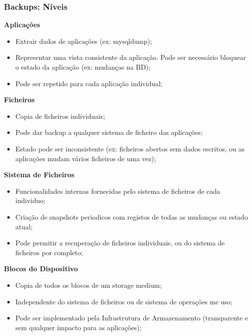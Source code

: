 \documentclass{article}
\begin{document}
\subsubsection{Backups: Níveis}

\begin{flushleft}
  \textbf{Aplicações}
  \begin{itemize}
    \item Extrair dados de aplicações (ex: mysqldump);
    \item Representar uma vista consistente da aplicação.
    Pode ser necessário bloquear o estado da aplicação (ex: mudanças na BD);
    \item Pode ser repetido para cada aplicação individual;
  \end{itemize}

  \textbf{Ficheiros}
  \begin{itemize}
    \item Copia de ficheiros individuais;
    \item Pode dar backup a qualquer sistema de ficheiro das aplicações;
    \item Estado pode ser inconsistente (ex: ficheiros abertos
    sem dados escritos, ou as aplicações mudam vários ficheiros de uma vez);  
  \end{itemize}

  \textbf{Sistema de Ficheiros}
  \begin{itemize}
    \item Funcionalidades internas fornecidas pelo sistema de ficheiros de cada individuo;
    \item Criação de snapshots periodicos com registos de todas as mudanças ou estado atual;
    \item Pode permitir a recuperação de ficheiros individuais, ou do sistema de ficheiros por completo;
  \end{itemize}

  \textbf{Blocos do Dispositivo}
  \begin{itemize}
    \item Copia de todos os blocos de um storage medium;
    \item Independente do sistema de ficheiros ou de sistema de operações me uso;
    \item Pode ser implementado pela Infrastrutura de Armazenamento (transparente e sem qualquer impacto para as aplicações);
  \end{itemize}
\end{flushleft}
\end{document}
